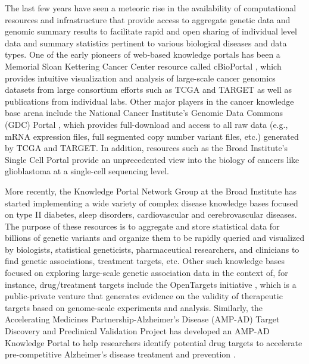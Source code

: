 \documentclass[letter]{bioinfo}
\begin{document}
The last few years have seen a meteoric rise in the availability of computational resources and infrastructure that provide access to aggregate genetic data and genomic summary results to facilitate rapid and open sharing of individual level data and summary statistics pertinent to various biological diseases and data types.  One of the early pioneers of web-based knowledge portals has been a Memorial Sloan Kettering Cancer Center resource called cBioPortal \citep{Cerami:2012:cBio,Gao:2013:Integrative}, which provides intuitive visualization and analysis of large-scale cancer genomics datasets from large consortium efforts such as TCGA \citep{TheCancerGenomeAtlasResearchNetwork:2013:Cancer} and TARGET \citep{Koscielny:2017:Open} as well as publications from individual labs.  Other major players in the cancer knowledge base arena include the National Cancer Institute's Genomic Data Commons (GDC) Portal \citep{Grossman:2016:Shared,Jensen:2017:NCI}, which provides full-download and access to all raw data (e.g., mRNA expression files, full segmented copy number variant files, etc.) generated by TCGA and TARGET.  In addition, resources such as the Broad Institute's Single Cell Portal \citep{Broad:NA:Single} provide an unprecedented view into the biology of cancers like glioblastoma at a single-cell sequencing level.    
	
More recently, the Knowledge Portal Network Group at the Broad Institute has started implementing a wide variety of complex disease knowledge bases focused on type II diabetes, sleep disorders, cardiovascular and cerebrovascular diseases.  The purpose of these resources is to aggregate and store statistical data for billions of genetic variants and organize them to be rapidly queried and visualized by biologists, statistical geneticists, pharmaceutical researchers, and clinicians to find genetic associations, treatment targets, etc.  Other such knowledge bases focused on exploring large-scale genetic association data in the context of, for instance, drug/treatment targets include the OpenTargets initiative \citep{Koscielny:2017:Open}, which is a public-private venture that generates evidence on the validity of therapeutic targets based on genome-scale experiments and analysis.  Similarly, the Accelerating Medicines Partnership-Alzheimer's Disease (AMP-AD) Target Discovery and Preclinical Validation Project has developed an AMP-AD Knowledge Portal to help researchers identify potential drug targets to accelerate pre-competitive Alzheimer's disease treatment and prevention \citep{NIA:2015:AMP}.  
	
\end{document}
